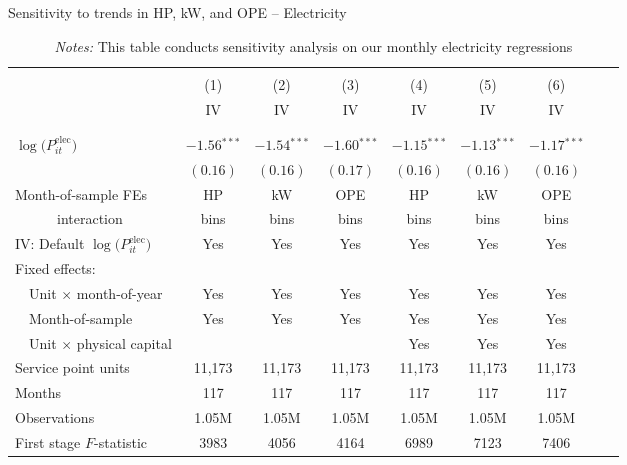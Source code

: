 \begin{table}[t!]\centering
\small
\caption{Sensitivity to trends in HP, kW, and OPE -- Electricity  \label{tab:elec_regs_month_bin_hp_fes}}
\vspace{-0.1cm}
\small
\begin{adjustbox}{center} 
\begin{tabular}{lcccccccc} 
\hline \hline
\vspace{-0.37cm}
\\
 & (1)  & (2)  & (3)  & (4)  & (5) & (6)  \\ 
[0.1em]
 & IV & IV & IV & IV & IV & IV  \\
\vspace{-0.37cm}
\\
\cline{2-7}
\vspace{-0.27cm}
\\
 $\log\big(P^{\text{elec}}_{it}\big)$ ~ & $-1.56$$^{***}$  & $-1.54$$^{***}$ & $-1.60$$^{***}$ & $-1.15$$^{***}$ & $-1.13$$^{***}$ & $-1.17$$^{***}$ \\ 
& $(0.16)$ & $(0.16)$ & $(0.17)$ & $(0.16)$ & $(0.16)$ & $(0.16)$  \\
[1.5em] 
Month-of-sample FEs & HP  & kW  & OPE   & HP  & kW  & OPE   \\
~~~~~~interaction & bins & bins & bins & bins & bins & bins \\ 
[1em] 
IV: Default $\log\big(P^{\text{elec}}_{it}\big)$  & Yes & Yes & Yes  & Yes  &  Yes &  Yes \\
[1em] 
Fixed effects: \\
[0.1em] 
~~Unit $\times$ month-of-year  & Yes  & Yes  & Yes  & Yes  & Yes  &  Yes   \\ 
[0.1em] 
~~Month-of-sample  & Yes  & Yes  & Yes  & Yes  & Yes  &  Yes    \\ 
[0.1em] 
~~Unit $\times$ physical capital &  & &  & Yes & Yes & Yes  \\
[1em] 
Service point units & 11,173 & 11,173 & 11,173 & 11,173 & 11,173 & 11,173   \\ 
[0.1em] 
Months  & 117 & 117 & 117 & 117 & 117 & 117  \\ 
[0.1em] 
Observations & 1.05M & 1.05M & 1.05M & 1.05M & 1.05M & 1.05M  \\ 
[0.1em] 
First stage $F$-statistic & 3983 & 4056 & 4164 & 6989 & 7123 & 7406  \\ 
[0.15em]
\hline
\end{tabular}
\end{adjustbox}
\captionsetup{width=\textwidth}
\caption*{\scriptsize \emph{Notes:} This table conducts sensitivity analysis on our monthly electricity regressions 
}
\end{table}
